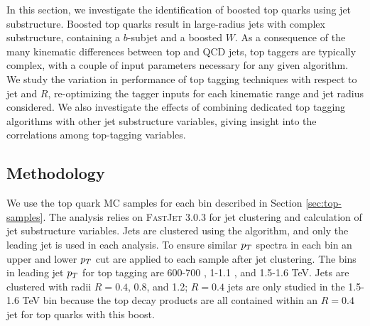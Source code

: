 In this section, we investigate the identification of boosted top quarks using jet substructure. Boosted top quarks result in large-radius jets with complex substructure, containing a $b$-subjet and a boosted $W$. As a consequence of the many kinematic differences between top and QCD jets, top taggers are typically complex, with a couple of input parameters necessary for any given algorithm. We study the variation in performance of top tagging techniques with respect to jet \pt and $R$, re-optimizing the tagger inputs for each kinematic range and jet radius considered. We also investigate the effects of combining dedicated top tagging algorithms with other jet substructure variables, giving insight into the correlations among top-tagging variables.

\subsection{Methodology}\label{sec:topmethod}

We use the top quark MC samples for each bin described in Section \ref{sec:top-samples}. The analysis  relies on \textsc{FastJet} 3.0.3 for jet clustering and
calculation of jet substructure variables. Jets are clustered using the \antikt algorithm, and only the leading jet is used in each analysis. To ensure similar $p_T$ spectra in each bin an upper and lower $p_T$ cut are applied to each sample after jet clustering. The bins in leading jet $p_T$
 for top tagging are 600-700 \GeV, 1-1.1 \TeV, and
1.5-1.6 TeV. Jets are clustered with radii $R=0.4$, 0.8, and 1.2; $R=0.4$ jets are only studied in the 1.5-1.6 TeV bin
because the top decay products are all contained within an $R=0.4$ jet for top quarks with this boost.

